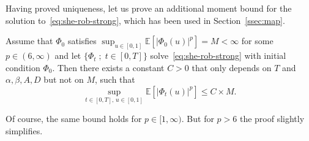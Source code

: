 \documentclass[AHL,Unicode,longabstracts]{cedram}
\newcommand{\bb}[1]{{\mathbb #1}}
\renewcommand{\le}{\leqslant}
\begin{document}
Having proved uniqueness, let us prove an additional moment bound for the solution to~\eqref{eq:she-rob-strong}, which has been used in Section~\ref{ssec:map}.

\goodbreak
\begin{lemm}\label{lem:she-moment}
Assume that $\Phi_0$ satisfies $\sup_{u \in [0,1]} \bb E[|\Phi_0(u)|^p] = M <\infty$ for some $p \in (6,\infty)$ and let $\{\Phi_t \; ; \; t \in [0,T]\}$ solve~\eqref{eq:she-rob-strong} with initial condition $\Phi_0$. Then there exists a constant $C>0$ that only depends on $T$ and $\alpha,\beta,A,D$ but not on $M$, such that
\[
\sup_{t\in [0,T],\, u \in [0,1]} \bb E[|\Phi_t(u)|^p] \le C\times M.
\]
\end{lemm}

\begin{rema}
Of course, the same bound holds for $p \in [1,\infty)$. But for $p>6$ the proof slightly simplifies.
\end{rema}
\end{document}
